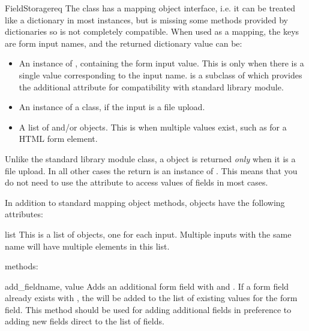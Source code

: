 \begin{classdesc}{FieldStorage}{req}
  The  class has a mapping object interface, i.e. it
  can be treated like a dictionary in most instances, but is missing some
  methods provided by dictionaries so is not completely compatible. When
  used as a mapping, the keys are form input names, and the returned
  dictionary value can be:

  \begin{itemize}
  \item
    An instance of , containing the form input
    value. This is only when there is a single value corresponding to the
    input name.  is a subclass of  which
    provides the additional  attribute for compatibility
    with standard library  module.
  \item
    An instance of a  class, if the input is a file upload.
  \item
    A list of  and/or  objects. This is
    when multiple values exist, such as for a  HTML form
    element.
  \end{itemize}

  \begin{notice}
    Unlike the standard library  module
     class, a  object is returned
    \emph{only} when it is a file upload. In all other cases the
    return is an instance of . This means that you
    do not need to use the  attribute to access values
    of fields in most cases.
  \end{notice}

  In addition to standard mapping object methods,  objects
  have the following attributes:

  \begin{memberdesc}{list}
    This is a list of  objects, one for each input. Multiple
    inputs with the same name will have multiple elements in this list.
  \end{memberdesc}

   methods:

  \begin{methoddesc}[FieldStorage]{add_field}{name, value}
    Adds an additional form field with  and .
    If a form field already exists with , the 
    will be added to the list of existing values for the form field.
    This method should be used for adding additional fields in
    preference to adding new fields direct to the list of fields.
  \end{methoddesc}


\end{classdesc}
